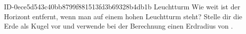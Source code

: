 \begin{exercise}
      {ID-0ece5d543c40bb8799f881513fd3b69328b4db1b}
      {Leuchtturm}
  \ifproblem\problem
    Wie weit ist der Horizont entfernt, wenn man auf einem  hohen
    Leuchtturm steht? Stelle dir die Erde als Kugel vor und verwende bei der
    Berechnung einen Erdradius von .
  \fi
\end{exercise}
